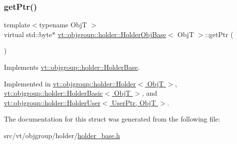 \mbox{\label{structvt_1_1objgroup_1_1holder_1_1_holder_obj_base_adbb4d702b76306f185e29388961e1e2d}} 
\subsubsection{\texorpdfstring{get\+Ptr()}{getPtr()}}
{\footnotesize\ttfamily template$<$typename ObjT $>$ \\
virtual std\+::byte$\ast$ \hyperlink{structvt_1_1objgroup_1_1holder_1_1_holder_obj_base}{vt\+::objgroup\+::holder\+::\+Holder\+Obj\+Base}$<$ ObjT $>$\+::get\+Ptr (\begin{DoxyParamCaption}{ }\end{DoxyParamCaption})\hspace{0.3cm}{\ttfamily [pure virtual]}}



Implements \hyperlink{structvt_1_1objgroup_1_1holder_1_1_holder_base_a9a15090cce1921fe9116a93b11b47be2}{vt\+::objgroup\+::holder\+::\+Holder\+Base}.



Implemented in \hyperlink{structvt_1_1objgroup_1_1holder_1_1_holder_a421058daef664fb76d90439aef1aaea5}{vt\+::objgroup\+::holder\+::\+Holder$<$ Obj\+T $>$}, \hyperlink{structvt_1_1objgroup_1_1holder_1_1_holder_basic_a857b56b22964a3524169f6fa30307d65}{vt\+::objgroup\+::holder\+::\+Holder\+Basic$<$ Obj\+T $>$}, and \hyperlink{structvt_1_1objgroup_1_1holder_1_1_holder_user_a85c5a7613142e86a830a0b5103f83ce4}{vt\+::objgroup\+::holder\+::\+Holder\+User$<$ User\+Ptr, Obj\+T $>$}.



The documentation for this struct was generated from the following file\+:\begin{DoxyCompactItemize}
\item 
src/vt/objgroup/holder/\hyperlink{holder__base_8h}{holder\+\_\+base.\+h}\end{DoxyCompactItemize}
